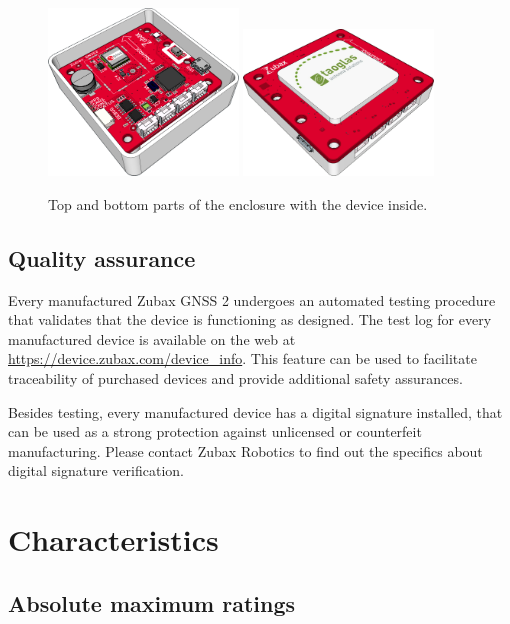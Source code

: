 \documentclass{zubaxdoc}
\begin{document}
\begin{figure}[hbt]
	\centering
	\includegraphics[width=0.45\textwidth]{enclosure_pcb_top}
	\includegraphics[width=0.45\textwidth]{enclosure_pcb_bottom}
	\caption{Top and bottom parts of the enclosure with the device inside.}
\end{figure}

\section{Quality assurance}

Every manufactured Zubax GNSS 2 undergoes an automated testing procedure that validates that
the device is functioning as designed.
The test log for every manufactured device is available on the web at
\url{https://device.zubax.com/device_info}.
This feature can be used to facilitate traceability of purchased devices and
provide additional safety assurances.

Besides testing, every manufactured device has a digital signature installed,
that can be used as a strong protection against unlicensed or counterfeit manufacturing.
Please contact Zubax Robotics
to find out the specifics about digital signature verification.

\chapter{Characteristics}

\section{Absolute maximum ratings}
\end{document}
